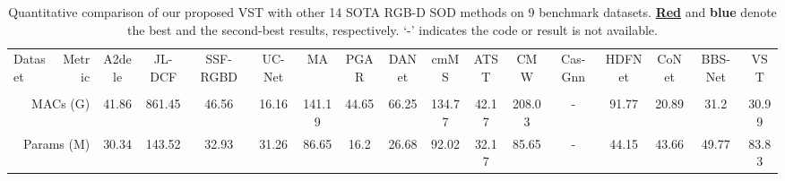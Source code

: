 \documentclass[10pt,twocolumn,letterpaper]{article}
\def\blu#1{\textbf{\color{blue} #1}} \def\red#1{\textbf{\color{red}\underline{#1}}}
\begin{document}
\begin{table*}[t]
  \centering
\footnotesize
\renewcommand{\arraystretch}{1.0}
\renewcommand{\tabcolsep}{0.7mm}
\caption{Quantitative comparison of our proposed VST with other 14 SOTA RGB-D SOD methods on 9 benchmark datasets. \red{Red} and \blu{blue} denote the best and the second-best results, respectively. `-' indicates the code or result is not available.}
\begin{tabular}{lr|cccccccccccccc|c}
  \hline

    Dataset
    & Metric
    & A2dele &JL-DCF & SSF-RGBD & UC-Net & MA & PGAR & DANet & cmMS & ATST  & CMW & Cas-Gnn & HDFNet & CoNet & BBS-Net & VST\\
    &
    & \cite{piao2020a2dele} &\cite{Fu2020JLDCF} & \cite{zhang2020select}   & \cite{zhang2020ucnet} & \cite{liu2020S2MA} & \cite{chen2020PGAR} & \cite{zhao2020DANet} & \cite{li2020cmMS} & \cite{zhang2020ATSA} &\cite{Li2020CMWNet} & \cite{luo2020Cas-Gnn} & \cite{HDFNet-ECCV2020} & \cite{Wei2020CoNet} & \cite{fan2020bbsnet}\\ \hline

   \multicolumn{2}{r|}{MACs (G)}  &41.86 &861.45 &46.56 &16.16 &141.19	&44.65 &66.25 &134.77 &42.17 &208.03 &-	&91.77 &20.89 &31.2 &30.99\\
   \multicolumn{2}{r|}{Params (M)} &30.34 &143.52 &32.93 &31.26 &86.65	&16.2 &26.68 &92.02 &32.17 &85.65 &- &44.15	&43.66 &49.77 &83.83\\
     \hline
     

\end{tabular}
\end{table*}
\end{document}
